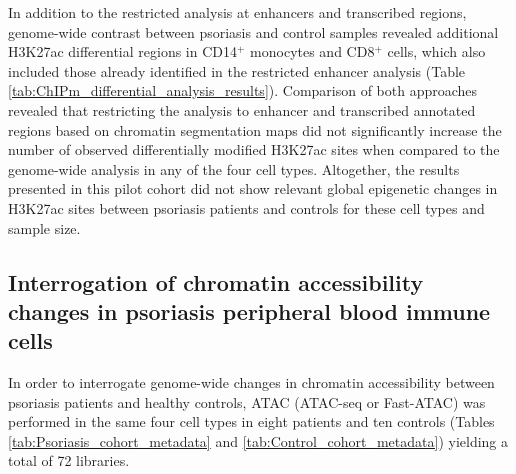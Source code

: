 In addition to the restricted analysis at enhancers and transcribed regions, genome-wide contrast between psoriasis and control samples revealed additional H3K27ac differential regions in CD14$^+$ monocytes and CD8$^+$ cells, which also included those already identified in the restricted enhancer analysis (Table \ref{tab:ChIPm_differential_analysis_results}). Comparison of both approaches revealed that restricting the analysis to enhancer and transcribed annotated regions based on chromatin segmentation maps did not significantly increase the number of observed differentially modified H3K27ac sites when compared to the genome-wide analysis in any of the four cell types. Altogether, the results presented in this pilot cohort did not show relevant global epigenetic changes in H3K27ac sites between psoriasis patients and controls for these cell types and sample size.




\subsection{Interrogation of chromatin accessibility changes in  psoriasis peripheral blood immune cells}

In order to interrogate genome-wide changes in chromatin accessibility between psoriasis patients and healthy controls, ATAC (ATAC-seq or Fast-ATAC) was performed in the same four cell types in eight patients and ten controls (Tables \ref{tab:Psoriasis_cohort_metadata} and \ref{tab:Control_cohort_metadata}) yielding a total of 72 libraries.


